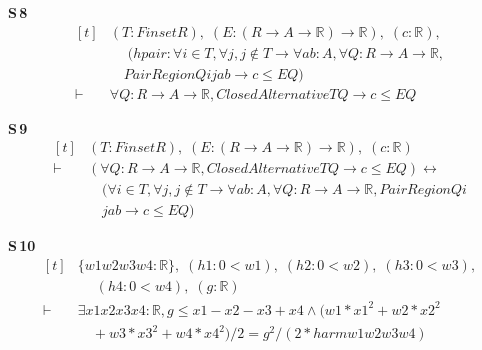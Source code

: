 \noindent\textbf{S\,8}\quad{}
{\footnotesize\[ \begin{aligned}[t]
&(\mathit{T} : \mathit{Finset} \mathit{R}),\; (\mathit{E} : (\mathit{R} \to \mathit{A} \to \mathbb{R} ) \to \mathbb{R} ),\; (\mathit{c} : \mathbb{R} ),\\
&\quad \; (\mathit{hpair} : \forall \mathit{i} \in \mathit{T}, \forall \mathit{j}, \mathit{j} \notin \mathit{T} \to \forall \mathit{a} \mathit{b} : \mathit{A}, \forall \mathit{Q} : \mathit{R} \to \mathit{A} \to \mathbb{R} ,\\
&\quad \mathit{PairRegion} \mathit{Q} \mathit{i} \mathit{j} \mathit{a} \mathit{b} \to \mathit{c} \leq \mathit{E} \mathit{Q})\\
\vdash\;&\forall \mathit{Q} : \mathit{R} \to \mathit{A} \to \mathbb{R} , \mathit{ClosedAlternative} \mathit{T} \mathit{Q} \to \mathit{c} \leq \mathit{E} \mathit{Q}
\end{aligned} \]}

\noindent\textbf{S\,9}\quad{}
{\footnotesize\[ \begin{aligned}[t]
&(\mathit{T} : \mathit{Finset} \mathit{R}),\; (\mathit{E} : (\mathit{R} \to \mathit{A} \to \mathbb{R} ) \to \mathbb{R} ),\; (\mathit{c} : \mathbb{R} )\\
\vdash\;&(\forall \mathit{Q} : \mathit{R} \to \mathit{A} \to \mathbb{R} , \mathit{ClosedAlternative} \mathit{T} \mathit{Q} \to \mathit{c} \leq \mathit{E} \mathit{Q}) \leftrightarrow\\
&\quad (\forall \mathit{i} \in \mathit{T}, \forall \mathit{j}, \mathit{j} \notin \mathit{T} \to \forall \mathit{a} \mathit{b} : \mathit{A}, \forall \mathit{Q} : \mathit{R} \to \mathit{A} \to \mathbb{R} , \mathit{PairRegion} \mathit{Q} \mathit{i}\\
&\quad \mathit{j} \mathit{a} \mathit{b} \to \mathit{c} \leq \mathit{E} \mathit{Q})
\end{aligned} \]}

\noindent\textbf{S\,10}\quad{}
{\footnotesize\[ \begin{aligned}[t]
&\{ \mathit{w1} \mathit{w2} \mathit{w3} \mathit{w4} : \mathbb{R} \},\; (\mathit{h1} : 0 < \mathit{w1}),\; (\mathit{h2} : 0 < \mathit{w2}),\; (\mathit{h3} : 0 < \mathit{w3}),\\
&\quad \; (\mathit{h4} : 0 < \mathit{w4}),\; (\mathit{g} : \mathbb{R} )\\
\vdash\;&\exists \mathit{x1} \mathit{x2} \mathit{x3} \mathit{x4} : \mathbb{R} , \mathit{g} \leq \mathit{x1} - \mathit{x2} - \mathit{x3} + \mathit{x4} \wedge (\mathit{w1}*\mathit{x1}^{2} + \mathit{w2}*\mathit{x2}^{2}\\
&\quad + \mathit{w3}*\mathit{x3}^{2} + \mathit{w4}*\mathit{x4}^{2}) / 2 = \mathit{g} ^{2} / (2 * \mathit{harm} \mathit{w1} \mathit{w2} \mathit{w3} \mathit{w4})
\end{aligned} \]}

